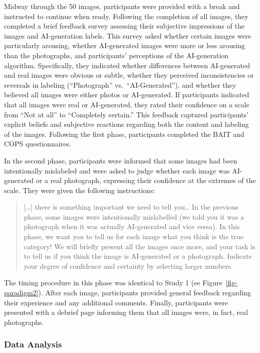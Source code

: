 \documentclass[
  jou,
  floatsintext,
  longtable,
  nolmodern,
  notxfonts,
  notimes,
  colorlinks=true,linkcolor=blue,citecolor=blue,urlcolor=blue]{apa7}
\begin{document}
Midway through the 50 images, participants were provided with a break
and instructed to continue when ready. Following the completion of all
images, they completed a brief feedback survey assessing their
subjective impressions of the images and AI-generation labels. This
survey asked whether certain images were particularly arousing, whether
AI-generated images were more or less arousing than the photographs, and
participants' perceptions of the AI-generation algorithm. Specifically,
they indicated whether differences between AI-generated and real images
were obvious or subtle, whether they perceived inconsistencies or
reversals in labeling (``Photograph'' vs.~``AI-Generated''), and whether
they believed all images were either photos or AI-generated. If
participants indicated that all images were real or AI-generated, they
rated their confidence on a scale from ``Not at all'' to ``Completely
certain.'' This feedback captured participants' explicit beliefs and
subjective reactions regarding both the content and labeling of the
images. Following the first phase, participants completed the BAIT and
COPS questionnaires.

In the second phase, participants were informed that some images had
been intentionally mislabeled and were asked to judge whether each image
was AI-generated or a real photograph, expressing their confidence at
the extremes of the scale. They were given the following instructions:

\begin{quote}
{[}\ldots{]} there is something important we need to tell you\ldots{} In
the previous phase, some images were intentionally mislabelled (we told
you it was a photograph when it was actually AI-generated and vice
versa). In this phase, we want you to tell us for each image what you
think is the true category! We will briefly present all the images once
more, and your task is to tell us if you think the image is AI-generated
or a photograph. Indicate your degree of confidence and certainty by
selecting larger numbers.
\end{quote}

The timing procedure in this phase was identical to Study 1 (ee
Figure~\ref{fig-paradigm2}). After each image, participants provided
general feedback regarding their experience and any additional comments.
Finally, participants were presented with a debrief page informing them
that all images were, in fact, real photographs.

\subsubsection{Data Analysis}\label{data-analysis}
\end{document}
